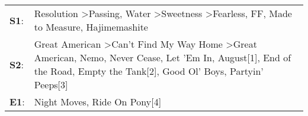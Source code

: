 \begin{supertabular}{p{0.03\textwidth}p{0.92\textwidth}}
 \textbf{S1}:  &                                                                                                                                                          Resolution\textsuperscript{} \textgreater \enspace Passing\textsuperscript{}, \enspace Water\textsuperscript{} \textgreater \enspace Sweetness\textsuperscript{} \textgreater \enspace Fearless\textsuperscript{}, \enspace FF\textsuperscript{}, \enspace Made to Measure\textsuperscript{}, \enspace Hajimemashite\textsuperscript{}  \enspace  \\
 \textbf{S2}:  &  Great American\textsuperscript{} \textgreater \enspace Can't Find My Way Home\textsuperscript{} \textgreater \enspace Great American\textsuperscript{}, \enspace Nemo\textsuperscript{}, \enspace Never Cease\textsuperscript{}, \enspace Let 'Em In\textsuperscript{}, \enspace August[1]\textsuperscript{}, \enspace End of the Road\textsuperscript{}, \enspace Empty the Tank[2]\textsuperscript{}, \enspace Good Ol' Boys\textsuperscript{}, \enspace Partyin' Peeps[3]\textsuperscript{}  \enspace  \\
 \textbf{E1}:  &                                                                                                                                                                                                                                                                                                                                                                                                                       Night Moves\textsuperscript{}, \enspace Ride On Pony[4]\textsuperscript{}  \enspace  \\
\end{supertabular}
